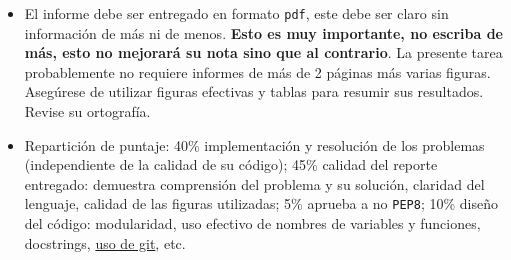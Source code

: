 \documentclass[letter, 11pt]{article}
\begin{document}
\begin{itemize}
\item El informe debe ser entregado en formato \texttt{pdf}, este debe ser
  claro sin información de más ni de menos. \textbf{Esto es muy importante, no
  escriba de más, esto no mejorará su nota sino que al contrario}. La presente
  tarea probablemente no requiere informes de más de 2 páginas más varias
  figuras.  Asegúrese de utilizar figuras efectivas y tablas para resumir sus
  resultados. Revise su ortografía.

 \item Repartición de puntaje: 40\% implementación y resolución de los
   problemas (independiente de la calidad de su código); 45\% calidad del
   reporte entregado: demuestra comprensión del problema y su solución,
   claridad del lenguaje, calidad de las figuras utilizadas; 5\% aprueba a no
   \texttt{PEP8}; 10\% diseño del código: modularidad, uso efectivo de nombres
   de variables y funciones, docstrings, \underline{uso de git}, etc.

\end{itemize}

\end{document}
